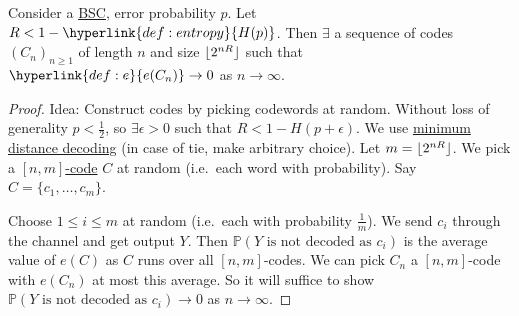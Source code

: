\documentclass{article}
\DeclarePairedDelimiter{\floor}{\lfloor}{\rfloor}
\newcommand{\Prob}{\mathbb{P}}
\newcommand{\1}[1]{\mathbbm{1}_{#1}}
\begin{document}
\begin{nprop}\label{prop:2.16}
    Consider a \hyperlink{def:bsc}{BSC}, error probability $p$.
    Let $R < 1 - \hyperlink{def:entropy}{H(p)}$.
    Then $\exists$ a sequence of codes $(C_n)_{n \geq 1}$ of length $n$ and size $\floor{2^{nR}}$ such that $\hyperlink{def:e}{e(C_n)} \to 0$ as $n \to \infty$.
\end{nprop}
\begin{proof}
    Idea: Construct codes by picking codewords at random.
    Without loss of generality $p < \frac{1}{2}$, so $\exists \epsilon > 0$ such that $R < 1 - H(p+\epsilon)$.
    We use \hyperlink{def:minimumDistanceRule}{minimum distance decoding} (in case of tie, make arbitrary choice).
    Let $m = \floor{2^{nR}}$.
    We pick a \hyperlink{def:binaryCode}{$[n, m]$-code} $C$ at random (i.e.\ each word with probability).
    Say $C = \{c_1, \dotsc, c_m\}$.

    Choose $1 \leq i \leq m$ at random (i.e.\ each with probability $\frac{1}{m}$).
    We send $c_i$ through the channel and get output $Y$.
    Then $\Prob(Y \text{ is not decoded as } c_i)$ is the average value of $e(C)$ as $C$ runs over all $[n,m]$-codes.
    We can pick $C_n$ a $[n, m]$-code with $e(C_n)$ at most this average.
    So it will suffice to show
    $\Prob(Y \text{ is not decoded as } c_i) \to 0$ as $n \to \infty$.


\end{proof}
\end{document}

